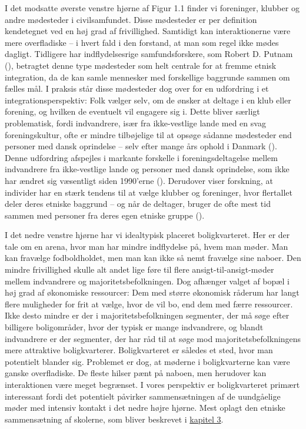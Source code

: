 \documentclass[
]{book}
\begin{document}
I det modsatte øverste venstre hjørne af Figur 1.1 finder vi foreninger, klubber og andre mødesteder i civilsamfundet. Disse mødesteder er per definition kendetegnet ved en høj grad af frivillighed. Samtidigt kan interaktionerne være mere overfladiske -- i hvert fald i den forstand, at man som regel ikke mødes dagligt. Tidligere har indflydelsesrige samfundsforskere, som Robert D. Putnam (), betragtet denne type mødesteder som helt centrale for at fremme etnisk integration, da de kan samle mennesker med forskellige baggrunde sammen om fælles mål. I praksis står disse mødesteder dog over for en udfordring i et integrationsperspektiv: Folk vælger selv, om de ønsker at deltage i en klub eller forening, og hvilken de eventuelt vil engagere sig i. Dette bliver særligt problematisk, fordi indvandrere, især fra ikke-vestlige lande med en svag foreningskultur, ofte er mindre tilbøjelige til at opsøge sådanne mødesteder end personer med dansk oprindelse -- selv efter mange års ophold i Danmark (). Denne udfordring afspejles i markante forskelle i foreningsdeltagelse mellem indvandrere fra ikke-vestlige lande og personer med dansk oprindelse, som ikke har ændret sig væsentligt siden 1990'erne (). Derudover viser forskning, at individer har en stærk tendens til at vælge klubber og foreninger, hvor flertallet deler deres etniske baggrund -- og når de deltager, bruger de ofte mest tid sammen med personer fra deres egen etniske gruppe ().

I det nedre venstre hjørne har vi idealtypisk placeret boligkvarteret. Her er der tale om en arena, hvor man har mindre indflydelse på, hvem man møder. Man kan fravælge fodboldholdet, men man kan ikke så nemt fravælge sine naboer. Den mindre frivillighed skulle alt andet lige føre til flere ansigt-til-ansigt-møder mellem indvandrere og majoritetsbefolkningen. Dog afhænger valget af bopæl i høj grad af økonomiske ressourcer: Dem med større økonomisk råderum har langt flere muligheder for frit at vælge, hvor de vil bo, end dem med færre ressourcer. Ikke desto mindre er der i majoritetsbefolkningen segmenter, der må søge efter billigere boligområder, hvor der typisk er mange indvandrere, og blandt indvandrere er der segmenter, der har råd til at søge mod majoritetsbefolkningens mere attraktive boligkvarterer. Boligkvarteret er således et sted, hvor man potentielt blander sig. Problemet er dog, at møderne i boligkvarterne kan være ganske overfladiske. De fleste hilser pænt på naboen, men herudover kan interaktionen være meget begrænset. I vores perspektiv er boligkvarteret primært interessant fordi det potentielt påvirker sammensætningen af de uundgåelige møder med intensiv kontakt i det nedre højre hjørne. Mest oplagt den etniske sammensætning af skolerne, som bliver beskrevet i \hyperref[kap3]{kapitel 3}.
\end{document}
